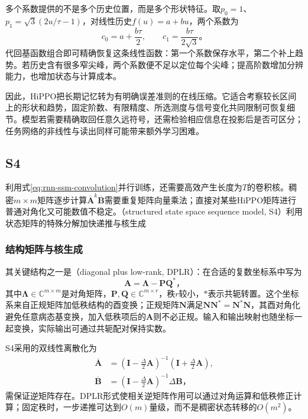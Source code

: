 多个系数提供的不是多个历史位置，而是多个形状特征。取$p_0=1$、$p_1=\sqrt3(2u/\tau-1)$，对线性历史$f(u)=a+bu$，两个系数为
\begin{equation}
  c_0=a+\frac{b\tau}{2},\qquad c_1=\frac{b\tau}{2\sqrt3}\text{。}
  \label{eq:rnn-hippo-linear-example}
\end{equation}
代回基函数组合即可精确恢复这条线性函数：第一个系数保存水平，第二个补上趋势。若历史含有很多窄尖峰，两个系数便不足以定位每个尖峰；提高阶数增加分辨能力，也增加状态与计算成本。

因此，HiPPO把长期记忆转为有明确误差准则的在线压缩。它适合考察较长区间上的形状和趋势，固定阶数、有限精度、所选测度与信号变化共同限制可恢复细节。模型若需要精确取回任意久远符号，还需检验相应信息在投影后是否可区分；任务网络的非线性与读出同样可能带来额外学习困难。

\subsection{S4}
\label{sec:rnn-s4}

利用式\eqref{eq:rnn-ssm-convolution}并行训练，还需要高效产生长度为$T$的卷积核。稠密$m\times m$矩阵逐步计算$\overline{\bm{A}}^k\overline{\bm{B}}$需要重复矩阵向量乘法；直接对某些HiPPO矩阵进行普通对角化又可能数值不稳定。（structured state space sequence model, S4）利用状态矩阵的特殊分解加快递推与核生成

\subsubsection{结构矩阵与核生成}
\label{sec:rnn-s4-structure}

其关键结构之一是（diagonal plus low-rank, DPLR）：在合适的复数坐标系中写为
\begin{equation}
  \bm{A}=\bm{\Lambda}-\bm{P}\bm{Q}^{*}\text{，}
  \label{eq:rnn-s4-dplr}
\end{equation}
其中$\bm{\Lambda}\in\mathbb{C}^{m\times m}$是对角矩阵，$\bm{P},\bm{Q}\in\mathbb{C}^{m\times r}$，秩$r$较小，$*$表示共轭转置。这个坐标系来自正规矩阵加低秩结构的酉变换；正规矩阵$\bm{N}$满足$\bm{N}\bm{N}^{*}=\bm{N}^{*}\bm{N}$，其酉对角化避免任意病态基变换，加入低秩项后的$\bm{A}$则不必正规。输入和输出映射也随坐标一起变换，实际输出可通过共轭配对保持实数。

S4采用的双线性离散化为
\begin{equation}
  \begin{aligned}
    \overline{\bm{A}}&=
      (\bm{I}-\tfrac{\Delta}{2}\bm{A})^{-1}
      (\bm{I}+\tfrac{\Delta}{2}\bm{A}),\\
    \overline{\bm{B}}&=
      (\bm{I}-\tfrac{\Delta}{2}\bm{A})^{-1}\Delta\bm{B}\text{，}
  \end{aligned}
  \label{eq:rnn-s4-bilinear}
\end{equation}
需保证逆矩阵存在。DPLR形式使相关逆矩阵作用可以通过对角运算和低秩修正计算；固定秩时，一步递推可达到$O(m)$量级，而不是稠密状态转移的$O(m^2)$。

